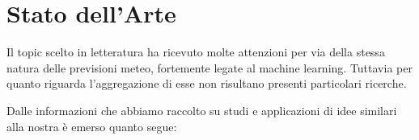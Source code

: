 

\chapter{Stato dell'Arte}
Il topic scelto in letteratura ha ricevuto molte attenzioni per via della stessa natura delle previsioni meteo, fortemente legate al machine learning. Tuttavia per quanto riguarda l'aggregazione di esse non risultano presenti particolari ricerche.
\par Dalle informazioni che abbiamo raccolto su studi e applicazioni di idee similari alla nostra è emerso quanto segue:

